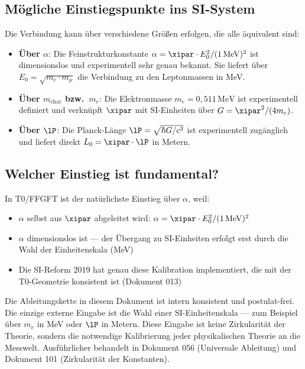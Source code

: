 \subsection{Mögliche Einstiegspunkte ins SI-System}

Die Verbindung kann über verschiedene Größen erfolgen, die alle äquivalent sind:

\begin{itemize}
	\item \textbf{Über $\alpha$}: Die Feinstrukturkonstante $\alpha = \xipar \cdot E_0^2 / (1\,\text{MeV})^2$ ist dimensionslos und experimentell sehr genau bekannt. Sie liefert über $E_0 = \sqrt{m_e \cdot m_\mu}$ die Verbindung zu den Leptonmassen in MeV.
	\item \textbf{Über $m_{\text{char}}$ bzw.\ $m_e$}: Die Elektronmasse $m_e = 0{,}511\,\text{MeV}$ ist experimentell definiert und verknüpft $\xipar$ mit SI-Einheiten über $G = \xipar^2/(4m_e)$.
	\item \textbf{Über $\lP$}: Die Planck-Länge $\lP = \sqrt{\hbar G/c^3}$ ist experimentell zugänglich und liefert direkt $L_0 = \xipar \cdot \lP$ in Metern.
\end{itemize}

\subsection{Welcher Einstieg ist fundamental?}

In T0/FFGFT ist der natürlichste Einstieg über $\alpha$, weil:
\begin{itemize}
	\item $\alpha$ selbst aus $\xipar$ abgeleitet wird: $\alpha = \xipar \cdot E_0^2 / (1\,\text{MeV})^2$
	\item $\alpha$ dimensionslos ist — der Übergang zu SI-Einheiten erfolgt erst durch die Wahl der Einheitenskala (MeV)
	\item Die SI-Reform 2019 hat genau diese Kalibration implementiert, die mit der T0-Geometrie konsistent ist (Dokument 013)
\end{itemize}

\begin{keyresult}
Die Ableitungskette in diesem Dokument ist intern konsistent und postulat-frei. Die einzige externe Eingabe ist die Wahl einer SI-Einheitenskala — zum Beispiel über $m_e$ in MeV oder $\lP$ in Metern. Diese Eingabe ist keine Zirkularität der Theorie, sondern die notwendige Kalibrierung jeder physikalischen Theorie an die Messwelt. Ausführlicher behandelt in Dokument 056 (Universale Ableitung) und Dokument 101 (Zirkularität der Konstanten).
\end{keyresult}


